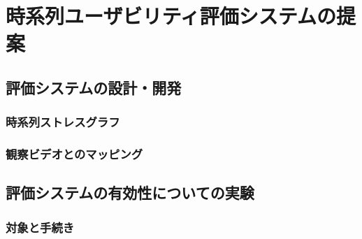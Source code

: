 \chapter{時系列ユーザビリティ評価システムの提案}
\label{chap:sequential}

\section{評価システムの設計・開発}

\subsection{時系列ストレスグラフ}

\subsection{観察ビデオとのマッピング}

\section{評価システムの有効性についての実験}

\subsection{対象と手続き}

